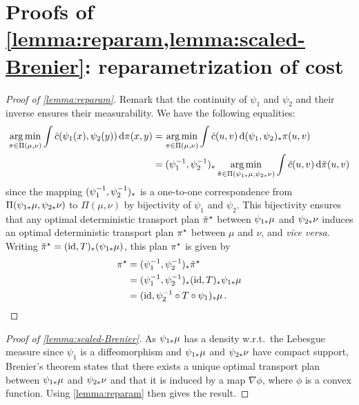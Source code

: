 \section{Proofs of \cref{lemma:reparam,lemma:scaled-Brenier}: reparametrization of cost}
\label{subsec:proof-scaled-brenier}
        \begin{proof}[Proof of \cref{lemma:reparam}]
            Remark that the continuity of $\psi_1$ and $\psi_2$ and their inverse ensures their measurability. We have the following equalities:
            \begin{align*}
                \operatorname*{arg\,min}_{\pi \in \Pi(\mu,\nu)} \int \tilde c(\psi_1 (x), \psi_2(y))\, \mathrm d\pi(x,y)& =\operatorname*{arg\,min}_{\pi \in \Pi(\mu,\nu)} \int \tilde c( u,v)\, \mathrm d(\psi_1,\psi_2)_*\pi(u,v)  \\
                & =(\psi_1 ^{-1} ,\psi_2^{-1} )_* \operatorname*{arg\,min}_{\tilde\pi \in \Pi(\psi_{1*} \mu, \psi_{2*}\nu)} \int \tilde c(u,v)\, \mathrm d\tilde\pi(u,v)
            \end{align*}
            since the mapping $(\psi_1 ^{-1} ,\psi_2^{-1} )_*$
            is a one-to-one correspondence from $\Pi(\psi_{1*} \mu, \psi_{2*}\nu)$ to $\Pi(\mu,\nu)$ by bijectivity of $\psi_1$ and $\psi_2$. This bijectivity ensures that any optimal deterministic transport plan $\tilde\pi^\star$ between $\psi_{1*}\mu$ and $\psi_{2*}\nu$ induces an optimal deterministic transport plan $\pi^\star$ between $\mu$ and $\nu$, and \textit{vice versa}. Writing $\tilde\pi^\star =(\operatorname{id},T)_*(\psi_{1*}\mu)$, this plan $\pi^\star$ is given by
            \begin{align*}
                \pi ^\star &= (\psi_1 ^{-1} ,\psi_2^{-1} )_*\tilde \pi ^\star  \\
                    & =(\psi_1 ^{-1} ,\psi_2^{-1} )_*(\operatorname{id},T)_*\psi_{1*} \mu \\
                    & =(\operatorname{id},\psi_2^{-1}\circ T\circ\psi_1)_*\mu\,. \qedhere
            \end{align*}
        \end{proof}
        \begin{proof}[Proof of \cref{lemma:scaled-Brenier}]
            As $\psi_{1*}\mu$ has a density w.r.t.~the Lebesgue measure since $\psi_1$ is a diffeomorphism and $\psi_{1*}\mu$ and $\psi_{2*}\nu$ have compact support, Brenier's theorem states that there exists a unique optimal transport plan between $\psi_{1*}\mu$ and $\psi_{2*}\nu$ and that it is induced by a map $\nabla \phi$, where $\phi$ is a convex function. Using \cref{lemma:reparam} then gives the result.
        \end{proof}
